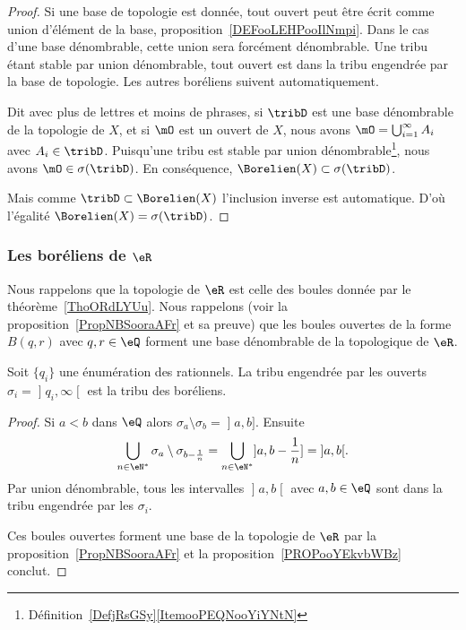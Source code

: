 \begin{proof}
	Si une base de topologie est donnée, tout ouvert peut être écrit comme union d'élément de la base, proposition~\ref{DEFooLEHPooIlNmpi}. Dans le cas d'une base dénombrable, cette union sera forcément dénombrable. Une tribu étant stable par union dénombrable, tout ouvert est dans la tribu engendrée par la base de topologie. Les autres boréliens suivent automatiquement.

	Dit avec plus de lettres et moins de phrases, si \( \tribD\) est une base dénombrable de la topologie de \( X\), et si \( \mO\) est un ouvert de \( X\), nous avons \( \mO=\bigcup_{i=1}^{\infty}A_i\) avec \( A_i\in\tribD\). Puisqu'une tribu est stable par union dénombrable\footnote{Définition~\ref{DefjRsGSy}\ref{ItemooPEQNooYiYNtN}}, nous avons \( \mO\in\sigma(\tribD)\). En conséquence, \( \Borelien(X)\subset\sigma(\tribD)\).

	Mais comme \( \tribD\subset\Borelien(X)\) l'inclusion inverse est automatique. D'où l'égalité \( \Borelien(X)=\sigma(\tribD)\).
\end{proof}

\subsubsection{Les boréliens de \texorpdfstring{\(  \eR\)}{R}}

Nous rappelons que la topologie de \( \eR\) est celle des boules donnée par le théorème~\ref{ThoORdLYUu}. Nous rappelons (voir la proposition~\ref{PropNBSooraAFr} et sa preuve) que les boules ouvertes de la forme \( B(q,r)\) avec \( q,r\in \eQ\) forment une base dénombrable de la topologique de \( \eR\).

\begin{lemma}   \label{LemZXnAbtl}
	Soit \( \{ q_i \}\) une énumération des rationnels. La tribu engendrée par les ouverts \( \sigma_i=\mathopen] q_i , \infty \mathclose[\) est la tribu des boréliens.
\end{lemma}

\begin{proof}
	Si \( a<b\) dans \( \eQ\) alors \( \sigma_a\setminus\sigma_b=\mathopen] a , b \mathclose]\). Ensuite
	\begin{equation}
		\bigcup_{n\in \eN^*}\sigma_a\setminus\sigma_{b-\frac{1}{ n }}=\bigcup_{n\in \eN^*}\mathopen] a , b-\frac{1}{ n } \mathclose]=\mathopen] a , b \mathclose[.
	\end{equation}
	Par union dénombrable, tous les intervalles \( \mathopen] a , b \mathclose[\) avec \( a,b\in \eQ\) sont dans la tribu engendrée par les \( \sigma_i\).

	Ces boules ouvertes forment une base de la topologie de \( \eR\) par la proposition~\ref{PropNBSooraAFr} et la proposition~\ref{PROPooYEkvbWBz} conclut.
\end{proof}

